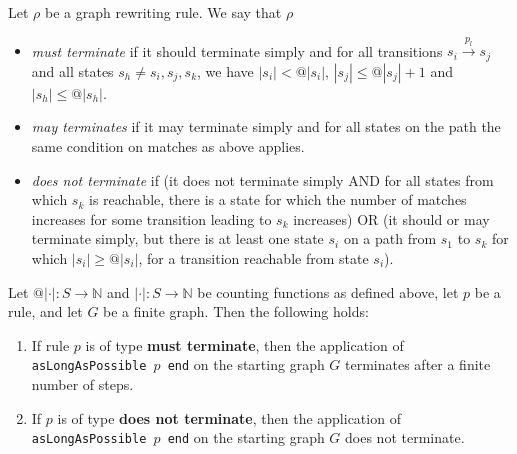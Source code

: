 \begin{definition}
    Let $\rho$ be a graph rewriting rule. We say that $\rho$
    \begin{itemize}
        \item \emph{must terminate} if it should terminate simply and for all transitions $s_i \xrightarrow{p_l} s_j$ and all states $s_h \mathop{\neq} s_i, s_j, s_k$, we have $\left| s_i \right| < @ | s_i |$, $\left| s_j \right| \leq @ | s_j |\mathop{+}1$ and $\left| s_h \right| \leq @ | s_h |$.
        \item \emph{may terminates} if it may terminate simply and for all states on the path the same condition on matches as above applies.
        \item \emph{does not terminate} if (it does not terminate simply AND for all states from which $s_k$ is reachable, there is a state for which the number of matches increases for some transition leading to $s_k$ increases) OR (it should or may terminate simply, but there is at least one state $s_i$ on a path from $s_1$ to $s_k$ for which $\left| s_i \right| \mathop{\geq} @ | s_i |$, for a transition reachable from state $s_i$).
    \end{itemize}
\end{definition}

\begin{theorem}
    Let $@|\cdot|: S \mathop{\to} \mathbb{N}$ and $|\cdot|: S \mathop{\to} \mathbb{N}$ be counting functions as defined above, let $p$ be a rule, and let $G$ be a finite graph. Then the following holds:
    \begin{enumerate}
        \item If rule $p$ is of type \textbf{must terminate}, then the application of \texttt{asLongAsPossible $p$ end} on the starting graph $G$ terminates after a finite number of steps.
        
        \item If $p$ is of type \textbf{does not terminate}, then the application of \texttt{asLongAsPossible $p$ end} on the starting graph $G$ does not terminate.
    \end{enumerate}
\end{theorem}  